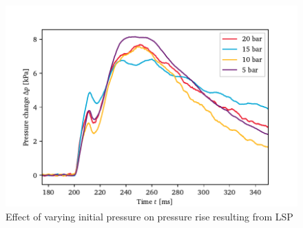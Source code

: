             \begin{figure}[h]
                \centering
                \includegraphics[]{assets/5 results/pressure_pressures}
                \caption{Effect of varying initial pressure on pressure rise resulting from LSP}
                \label{fig:pressure_pressures}
            \end{figure}


